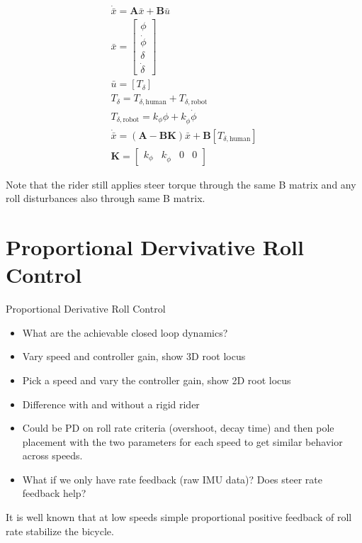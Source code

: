 \documentclass[12pt]{article}
\begin{document}
\begin{align}
  \dot{\bar{x}} = \mathbf{A} \bar{x} + \mathbf{B} \bar{u} \\
  \bar{x} = \begin{bmatrix} \phi \\ \dot{\phi} \\ \delta \\ \dot{\delta} \end{bmatrix} \\
  \bar{u} = \left[ T_\delta \right] \\
  T_\delta = T_{\delta,\textrm{human}} + T_{\delta,\textrm{robot}} \\
  T_{\delta,\textrm{robot}} = k_\phi \phi + k_{\dot{\phi}} \dot{\phi} \\
  \dot{\bar{x}} = \left( \mathbf{A} - \mathbf{B} \mathbf{K} \right) \bar{x} + \mathbf{B} \left[ T_{\delta,\textrm{human}} \right] \\
  \mathbf{K} = \begin{bmatrix} k_\phi & k_{\dot{\phi}} & 0 & 0 \end{bmatrix}
\end{align}

Note that the rider still applies steer torque through the same B matrix and
any roll disturbances also through same B matrix.

\section{Proportional Dervivative Roll Control}

Proportional Derivative Roll Control

\begin{itemize}
  \item What are the achievable closed loop dynamics?
  \item Vary speed and controller gain, show 3D root locus
  \item Pick a speed and vary the controller gain, show 2D root locus
  \item Difference with and without a rigid rider
  \item Could be PD on roll rate criteria (overshoot, decay time) and then pole
    placement with the two parameters for each speed to get similar behavior
    across speeds.
  \item What if we only have rate feedback (raw IMU data)? Does steer rate
    feedback help?
\end{itemize}

It is well known that at low speeds simple proportional positive feedback of
roll rate stabilize the bicycle.
\end{document}
